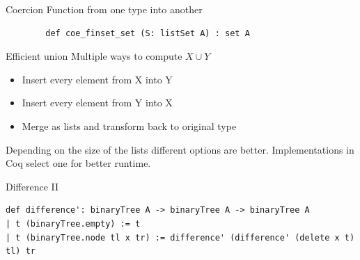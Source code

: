 \documentclass[aspectratio=169]{beamer}
\begin{document}
\begin{frame}[fragile]{Coercion}
    Function from one type into another

    \begin{lstlisting}
        def coe_finset_set (S: listSet A) : set A
    \end{lstlisting}
\end{frame}
\begin{frame}{Efficient union\cite{redblacktree}}
    Multiple ways to compute $X \cup Y$

    \begin{itemize}
        \item Insert every element from X into Y
        \item Insert every element from Y into X
        \item Merge as lists and transform back to original type
    \end{itemize}

    Depending on the size of the lists different options are better. 
    Implementations in Coq select one for better runtime.
\end{frame}

\begin{frame}[fragile]{Difference II}
    \begin{lstlisting}
def difference': binaryTree A -> binaryTree A -> binaryTree A
| t (binaryTree.empty) := t
| t (binaryTree.node tl x tr) := difference' (difference' (delete x t) tl) tr
    \end{lstlisting}
\end{frame}
\end{document}
